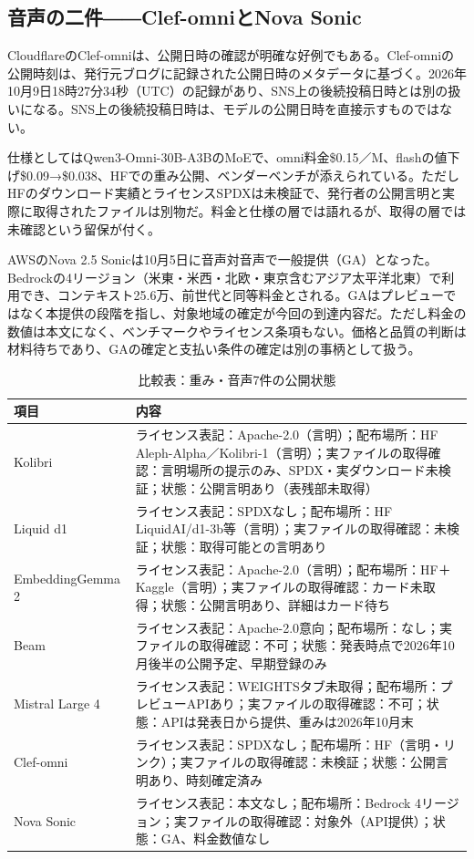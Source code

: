 \subsection*{音声の二件――Clef-omniとNova Sonic}

CloudflareのClef-omniは、公開日時の確認が明確な好例でもある。Clef-omniの公開時刻は、発行元ブログに記録された公開日時のメタデータに基づく。2026年10月9日18時27分34秒（UTC）の記録があり、SNS上の後続投稿日時とは別の扱いになる。SNS上の後続投稿日時は、モデルの公開日時を直接示すものではない。\cite{clefomni}

仕様としてはQwen3-Omni-30B-A3BのMoEで、omni料金\$0.15／M、flashの値下げ\$0.09→\$0.038、HFでの重み公開、ベンダーベンチが添えられている。ただしHFのダウンロード実績とライセンスSPDXは未検証で、発行者の公開言明と実際に取得されたファイルは別物だ。料金と仕様の層では語れるが、取得の層では未確認という留保が付く。\cite{clefomni}

AWSのNova 2.5 Sonicは10月5日に音声対音声で一般提供（GA）となった。Bedrockの4リージョン（米東・米西・北欧・東京含むアジア太平洋北東）で利用でき、コンテキスト25.6万、前世代と同等料金とされる。GAはプレビューではなく本提供の段階を指し、対象地域の確定が今回の到達内容だ。ただし料金の数値は本文になく、ベンチマークやライセンス条項もない。価格と品質の判断は材料待ちであり、GAの確定と支払い条件の確定は別の事柄として扱う。\cite{novasonic}

\begin{table}[htbp]
\centering\footnotesize
\begin{tabularx}{0.98\linewidth}{@{}lX@{}}
\toprule
項目 & 内容 \\
\midrule
Kolibri & ライセンス表記：Apache-2.0（言明）；配布場所：HF Aleph-Alpha／Kolibri-1（言明）；実ファイルの取得確認：言明場所の提示のみ、SPDX・実ダウンロード未検証；状態：公開言明あり（表残部未取得） \\
Liquid d1 & ライセンス表記：SPDXなし；配布場所：HF LiquidAI/d1-3b等（言明）；実ファイルの取得確認：未検証；状態：取得可能との言明あり \\
EmbeddingGemma 2 & ライセンス表記：Apache-2.0（言明）；配布場所：HF＋Kaggle（言明）；実ファイルの取得確認：カード未取得；状態：公開言明あり、詳細はカード待ち \\
Beam & ライセンス表記：Apache-2.0意向；配布場所：なし；実ファイルの取得確認：不可；状態：発表時点で2026年10月後半の公開予定、早期登録のみ \\
Mistral Large 4 & ライセンス表記：WEIGHTSタブ未取得；配布場所：プレビューAPIあり；実ファイルの取得確認：不可；状態：APIは発表日から提供、重みは2026年10月末 \\
Clef-omni & ライセンス表記：SPDXなし；配布場所：HF（言明・リンク）；実ファイルの取得確認：未検証；状態：公開言明あり、時刻確定済み \\
Nova Sonic & ライセンス表記：本文なし；配布場所：Bedrock 4リージョン；実ファイルの取得確認：対象外（API提供）；状態：GA、料金数値なし \\
\bottomrule
\end{tabularx}
\caption{比較表：重み・音声7件の公開状態}
\end{table}
\noindent \cite{kolibri}\cite{liquidd1}\cite{embedgemma2}\cite{beam}\cite{mistral4}\cite{clefomni}\cite{novasonic}

